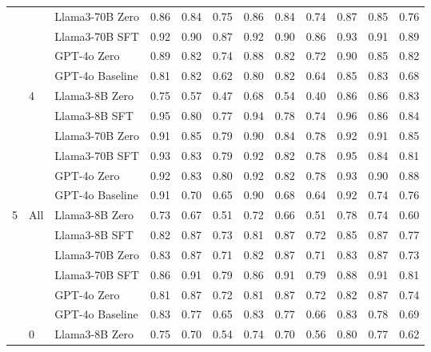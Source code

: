 \begin{longtable}[t]{ll>{}l|rr>{}r|rr>{}r|rrr}
 &  & Llama3-70B Zero & 0.86 & 0.84 & 0.75 & 0.86 & 0.84 & 0.74 & 0.87 & 0.85 & 0.76\\

 &  & Llama3-70B SFT & 0.92 & 0.90 & 0.87 & 0.92 & 0.90 & 0.86 & 0.93 & 0.91 & 0.89\\

 &  & GPT-4o Zero & 0.89 & 0.82 & 0.74 & 0.88 & 0.82 & 0.72 & 0.90 & 0.85 & 0.82\\

 &  & GPT-4o Baseline & 0.81 & 0.82 & 0.62 & 0.80 & 0.82 & 0.64 & 0.85 & 0.83 & 0.68\\
\cmidrule{2-12}
 & 4 & Llama3-8B Zero & 0.75 & 0.57 & 0.47 & 0.68 & 0.54 & 0.40 & 0.86 & 0.86 & 0.83\\

 &  & Llama3-8B SFT & 0.95 & 0.80 & 0.77 & 0.94 & 0.78 & 0.74 & 0.96 & 0.86 & 0.84\\

 &  & Llama3-70B Zero & 0.91 & 0.85 & 0.79 & 0.90 & 0.84 & 0.78 & 0.92 & 0.91 & 0.85\\

 &  & Llama3-70B SFT & 0.93 & 0.83 & 0.79 & 0.92 & 0.82 & 0.78 & 0.95 & 0.84 & 0.81\\

 &  & GPT-4o Zero & 0.92 & 0.83 & 0.80 & 0.92 & 0.82 & 0.78 & 0.93 & 0.90 & 0.88\\

 &  & GPT-4o Baseline & 0.91 & 0.70 & 0.65 & 0.90 & 0.68 & 0.64 & 0.92 & 0.74 & 0.76\\
\cmidrule{1-12}
5 & All & Llama3-8B Zero & 0.73 & 0.67 & 0.51 & 0.72 & 0.66 & 0.51 & 0.78 & 0.74 & 0.60\\

 &  & Llama3-8B SFT & 0.82 & 0.87 & 0.73 & 0.81 & 0.87 & 0.72 & 0.85 & 0.87 & 0.77\\

 &  & Llama3-70B Zero & 0.83 & 0.87 & 0.71 & 0.82 & 0.87 & 0.71 & 0.83 & 0.87 & 0.73\\

 &  & Llama3-70B SFT & 0.86 & 0.91 & 0.79 & 0.86 & 0.91 & 0.79 & 0.88 & 0.91 & 0.81\\

 &  & GPT-4o Zero & 0.81 & 0.87 & 0.72 & 0.81 & 0.87 & 0.72 & 0.82 & 0.87 & 0.74\\

 &  & GPT-4o Baseline & 0.83 & 0.77 & 0.65 & 0.83 & 0.77 & 0.66 & 0.83 & 0.78 & 0.69\\
\cmidrule{2-12}
 & 0 & Llama3-8B Zero & 0.75 & 0.70 & 0.54 & 0.74 & 0.70 & 0.56 & 0.80 & 0.77 & 0.62\\


\end{longtable}

